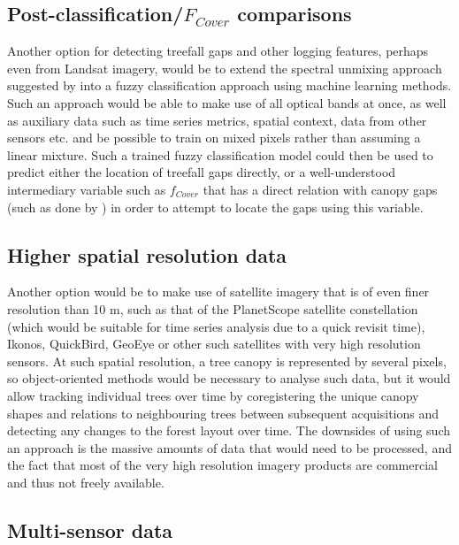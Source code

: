 \documentclass[a4paper,12pt]{scrbook}
\begin{document}
\subsection{Post-classification/$F_{Cover}$ comparisons}

Another option for detecting treefall gaps and other logging features, perhaps even from Landsat imagery, would be to extend the spectral unmixing approach suggested by \citet{asner_canopy_2004} into a fuzzy classification approach using machine learning methods. Such an approach would be able to make use of all optical bands at once, as well as auxiliary data such as time series metrics, spatial context, data from other sensors etc. and be possible to train on mixed pixels rather than assuming a linear mixture. Such a trained fuzzy classification model could then be used to predict either the location of treefall gaps directly, or a well-understood intermediary variable such as $f_{Cover}$ that has a direct relation with canopy gaps (such as done by \citet{bacour_neural_2006}) in order to attempt to locate the gaps using this variable.

\subsection{Higher spatial resolution data}

Another option would be to make use of satellite imagery that is of even finer resolution than 10 m, such as that of the PlanetScope satellite constellation (which would be suitable for time series analysis due to a quick revisit time), Ikonos, QuickBird, GeoEye or other such satellites with very high resolution sensors. At such spatial resolution, a tree canopy is represented by several pixels, so object-oriented methods would be necessary to analyse such data, but it would allow tracking individual trees over time by coregistering the unique canopy shapes and relations to neighbouring trees between subsequent acquisitions and detecting any changes to the forest layout over time. The downsides of using such an approach is the massive amounts of data that would need to be processed, and the fact that most of the very high resolution imagery products are commercial and thus not freely available.

\subsection{Multi-sensor data}
\end{document}
